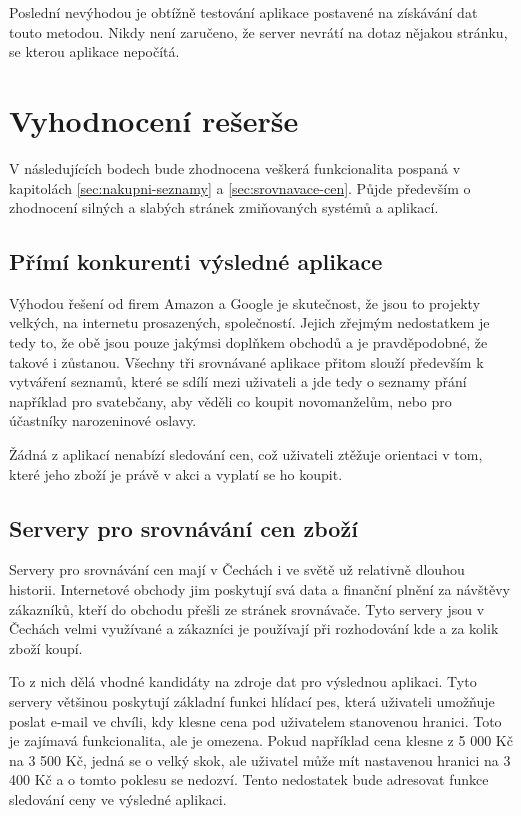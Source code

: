 Poslední nevýhodou je obtížně testování aplikace postavené na získávání dat touto metodou. Nikdy není zaručeno, že server nevrátí na dotaz nějakou stránku, se kterou aplikace nepočítá.

\section{Vyhodnocení rešerše}
V následujících bodech bude zhodnocena veškerá funkcionalita pospaná v kapitolách \ref{sec:nakupni-seznamy} a \ref{sec:srovnavace-cen}. Půjde především o zhodnocení silných a slabých stránek zmiňovaných systémů a aplikací. 


\subsection{Přímí konkurenti výsledné aplikace}
Výhodou řešení od firem Amazon a Google je skutečnost, že jsou to projekty velkých, na internetu prosazených, společností. Jejich zřejmým nedostatkem je tedy to, že obě jsou pouze jakýmsi doplňkem obchodů a je pravděpodobné, že takové i zůstanou. Všechny tři srovnávané aplikace přitom slouží především k vytváření seznamů, které se sdílí mezi uživateli a jde tedy o seznamy přání například pro svatebčany, aby věděli co koupit novomanželům, nebo pro účastníky narozeninové oslavy.

Žádná z aplikací nenabízí sledování cen, což uživateli ztěžuje orientaci v tom, které jeho zboží je právě v akci a vyplatí se ho koupit.
\subsection{Servery pro srovnávání cen zboží}
Servery pro srovnávání cen mají v Čechách i ve světě už relativně dlouhou historii. Internetové obchody jim poskytují svá data a finanční plnění za návštěvy zákazníků, kteří do obchodu přešli ze stránek srovnávače. Tyto servery jsou v Čechách velmi využívané a zákazníci je používají při rozhodování kde a za kolik zboží koupí.

To z nich dělá vhodné kandidáty na zdroje dat pro výslednou aplikaci. Tyto servery většinou poskytují základní funkci hlídací pes, která uživateli umožňuje poslat e-mail ve chvíli, kdy klesne cena pod uživatelem stanovenou hranici. Toto je zajímavá funkcionalita, ale je omezena. Pokud například cena klesne z 5 000 Kč na 3 500 Kč, jedná se o velký skok, ale uživatel může mít nastavenou hranici na 3 400 Kč a o tomto poklesu se nedozví. Tento nedostatek bude adresovat funkce sledování ceny ve výsledné aplikaci.
